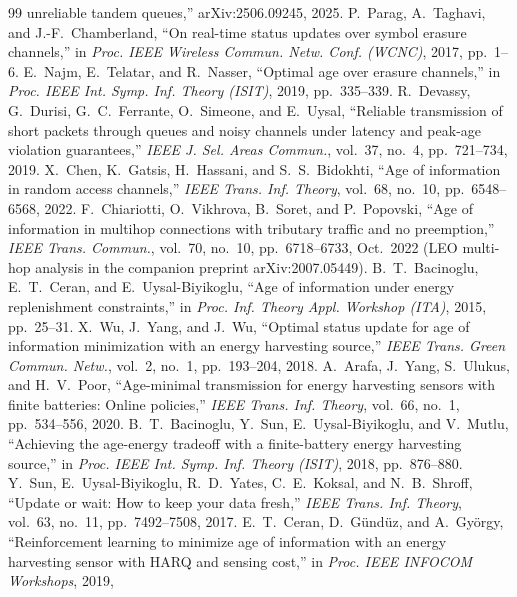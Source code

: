 \documentclass[twocolumn,3p,times,procedia]{elsarticle}
\begin{document}
\begin{thebibliography}{99}
unreliable tandem queues,'' arXiv:2506.09245, 2025.
P.~Parag, A.~Taghavi, and J.-F.~Chamberland, ``On real-time status updates
over symbol erasure channels,'' in \emph{Proc. IEEE Wireless Commun. Netw.
Conf. (WCNC)}, 2017, pp.~1--6.
E.~Najm, E.~Telatar, and R.~Nasser, ``Optimal age over erasure channels,''
in \emph{Proc. IEEE Int. Symp. Inf. Theory (ISIT)}, 2019, pp.~335--339.
R.~Devassy, G.~Durisi, G.~C.~Ferrante, O.~Simeone, and E.~Uysal, ``Reliable
transmission of short packets through queues and noisy channels under
latency and peak-age violation guarantees,'' \emph{IEEE J. Sel. Areas
Commun.}, vol.~37, no.~4, pp.~721--734, 2019.
X.~Chen, K.~Gatsis, H.~Hassani, and S.~S.~Bidokhti, ``Age of information in
random access channels,'' \emph{IEEE Trans. Inf. Theory}, vol.~68, no.~10,
pp.~6548--6568, 2022.
F.~Chiariotti, O.~Vikhrova, B.~Soret, and P.~Popovski, ``Age of
information in multihop connections with tributary traffic and no
preemption,'' \emph{IEEE Trans. Commun.}, vol.~70, no.~10,
pp.~6718--6733, Oct.\ 2022 (LEO multi-hop analysis in the companion
preprint arXiv:2007.05449).
B.~T.~Bacinoglu, E.~T.~Ceran, and E.~Uysal-Biyikoglu, ``Age of information
under energy replenishment constraints,'' in \emph{Proc. Inf. Theory Appl.
Workshop (ITA)}, 2015, pp.~25--31.
X.~Wu, J.~Yang, and J.~Wu, ``Optimal status update for age of information
minimization with an energy harvesting source,'' \emph{IEEE Trans. Green
Commun. Netw.}, vol.~2, no.~1, pp.~193--204, 2018.
A.~Arafa, J.~Yang, S.~Ulukus, and H.~V.~Poor, ``Age-minimal transmission
for energy harvesting sensors with finite batteries: Online policies,''
\emph{IEEE Trans. Inf. Theory}, vol.~66, no.~1, pp.~534--556, 2020.
B.~T.~Bacinoglu, Y.~Sun, E.~Uysal-Biyikoglu, and V.~Mutlu, ``Achieving the
age-energy tradeoff with a finite-battery energy harvesting source,'' in
\emph{Proc. IEEE Int. Symp. Inf. Theory (ISIT)}, 2018, pp.~876--880.
Y.~Sun, E.~Uysal-Biyikoglu, R.~D.~Yates, C.~E.~Koksal, and N.~B.~Shroff,
``Update or wait: How to keep your data fresh,'' \emph{IEEE Trans. Inf.
Theory}, vol.~63, no.~11, pp.~7492--7508, 2017.
E.~T.~Ceran, D.~G\"und\"uz, and A.~Gy\"orgy, ``Reinforcement learning to
minimize age of information with an energy harvesting sensor with HARQ and
sensing cost,'' in \emph{Proc. IEEE INFOCOM Workshops}, 2019,

\end{thebibliography}
\end{document}
